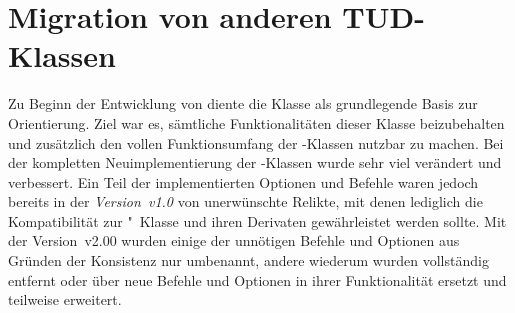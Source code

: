 \section[%
  Das Paket \Package{tudscrcomp} -- Migration von anderen TUD-Klassen%
]{%
  Migration von anderen TUD-Klassen%
}
%
\begin{DeclareEntity}{}
\noindent{}

\bigskip\noindent
Zu Beginn der Entwicklung von \TUDScript diente die Klasse  als 
grundlegende Basis zur Orientierung. Ziel war es, sämtliche Funktionalitäten 
dieser Klasse beizubehalten und zusätzlich den vollen Funktionsumfang der 
\KOMAScript-Klassen nutzbar zu machen. Bei der kompletten Neuimplementierung 
der \TUDScript-Klassen wurde sehr viel verändert und verbessert. Ein Teil der 
implementierten Optionen und Befehle waren jedoch bereits in der 
\emph{Version~v1.0} von \TUDScript unerwünschte Relikte, mit denen lediglich 
die Kompatibilität zur "~Klasse und ihren Derivaten 
gewährleistet werden sollte. Mit der Version~v2.00 wurden einige der unnötigen 
Befehle und Optionen aus Gründen der Konsistenz nur umbenannt, andere wiederum 
wurden vollständig entfernt oder über neue Befehle und Optionen in ihrer 
Funktionalität ersetzt und teilweise erweitert. 


\end{DeclareEntity}

